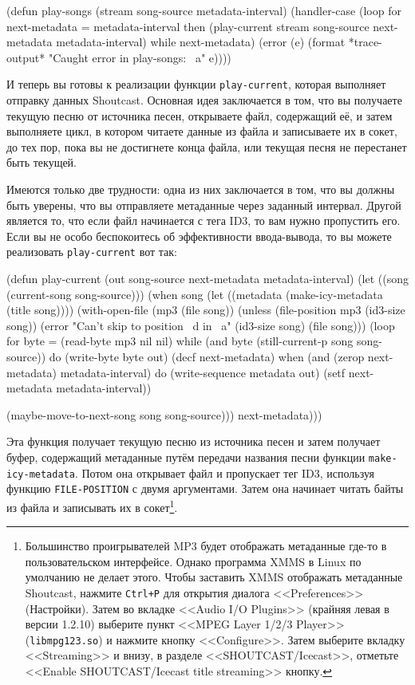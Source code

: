 \begin{myverb}
(defun play-songs (stream song-source metadata-interval)
  (handler-case 
      (loop
         for next-metadata = metadata-interval
         then (play-current 
               stream 
               song-source
               next-metadata
               metadata-interval)
         while next-metadata)
    (error (e) (format *trace-output* "Caught error in play-songs: ~a" e))))
\end{myverb}

И теперь вы готовы к реализации функции \lstinline{play-current}, которая выполняет отправку
данных Shoutcast.  Основная идея заключается в том, что вы получаете текущую песню от
источника песен, открываете файл, содержащий её, и затем выполняете цикл, в котором читаете
данные из файла и записываете их в сокет, до тех пор, пока вы не достигнете конца файла,
или текущая песня не перестанет быть текущей.

Имеются только две трудности: одна из них заключается в том, что вы должны быть уверены,
что вы отправляете метаданные через заданный интервал.  Другой является то, что если файл
начинается с тега ID3, то вам нужно пропустить его.  Если вы не особо беспокоитесь об
эффективности ввода-вывода, то вы можете реализовать \lstinline{play-current} вот так:

\begin{myverb}
(defun play-current (out song-source next-metadata metadata-interval)
  (let ((song (current-song song-source)))
    (when song
      (let ((metadata (make-icy-metadata (title song))))
        (with-open-file (mp3 (file song))
          (unless (file-position mp3 (id3-size song))
            (error "Can't skip to position ~d in ~a" (id3-size song) (file song)))
          (loop for byte = (read-byte mp3 nil nil)
             while (and byte (still-current-p song song-source)) do
               (write-byte byte out)
               (decf next-metadata)
             when (and (zerop next-metadata) metadata-interval) do
               (write-sequence metadata out)
               (setf next-metadata metadata-interval))

          (maybe-move-to-next-song song song-source)))
      next-metadata)))
\end{myverb}

Эта функция получает текущую песню из источника песен и затем получает буфер, содержащий
метаданные путём передачи названия песни функции \lstinline{make-icy-metadata}.  Потом она
открывает файл и пропускает тег ID3, используя функцию \lstinline{FILE-POSITION} с двумя
аргументами.  Затем она начинает читать байты из файла и записывать их в
сокет\footnote{Большинство проигрывателей MP3 будет отображать метаданные где-то в
  пользовательском интерфейсе.  Однако программа XMMS в Linux по умолчанию не делает
  этого. Чтобы заставить XMMS отображать метаданные Shoutcast, нажмите \lstinline{Ctrl+P} для
  открытия диалога <<Preferences>> (Настройки).  Затем во вкладке <<Audio I/O Plugins>>
  (крайняя левая в версии 1.2.10) выберите пункт <<MPEG Layer 1/2/3 Player>>
  (\lstinline{libmpg123.so}) и нажмите кнопку <<Configure>>.  Затем выберите вкладку
  <<Streaming>> и внизу, в разделе <<SHOUTCAST/Icecast>>, отметьте <<Enable
  SHOUTCAST/Icecast title streaming>> кнопку.}.

